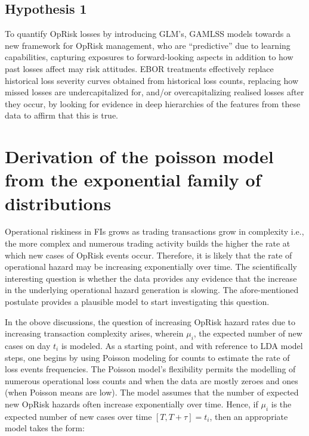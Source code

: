 \documentclass{DissertateUSU}
\begin{document}
\subsection{Hypothesis 1}
\label{Hyp1:Hypothesis 1}

To quantify OpRisk losses by introducing GLM's, GAMLSS models towards a
new framework for OpRisk management, who are ``predictive'' due to
learning capabilities, capturing exposures to forward-looking aspects in
addition to how past losses affect may risk attitudes. EBOR treatments
effectively replace historical loss severity curves obtained from
historical loss counts, replacing how missed losses are undercapitalized
for, and/or overcapitalizing realised losses after they occur, by
looking for evidence in deep hierarchies of the features from these data
to affirm that this is true.

\section{Derivation of the poisson model from the exponential family of distributions}
\label{sec:Derivation of the poisson model from the exponential family of distributions}

Operational riskiness in FIs grows as trading transactions grow in
complexity i.e., the more complex and numerous trading activity builds
the higher the rate at which new cases of OpRisk events occur.
Therefore, it is likely that the rate of operational hazard may be
increasing exponentially over time. The scientifically interesting
question is whether the data provides any evidence that the increase in
the underlying operational hazard generation is slowing. The
afore-mentioned postulate provides a plausible model to start
investigating this question.\medskip

In the obove discussions, the question of increasing OpRisk hazard rates
due to increasing transaction complexity arises, wherein \(\mu_i\), the
expected number of new cases on day \(t_i\) is modeled. As a starting
point, and with reference to LDA model steps, one begins by using
Poisson modeling for counts to estimate the rate of loss events
frequencies. The Poisson model's flexibility permits the modelling of
numerous operational loss counts and when the data are mostly zeroes and
ones (when Poisson means are low). The model assumes that the number of
expected new OpRisk hazards often increase exponentially over time.
Hence, if \(\mu_i\) is the expected number of new cases over time
\([T,T+\tau] = t_i\), then an appropriate model takes the form:
\end{document}
